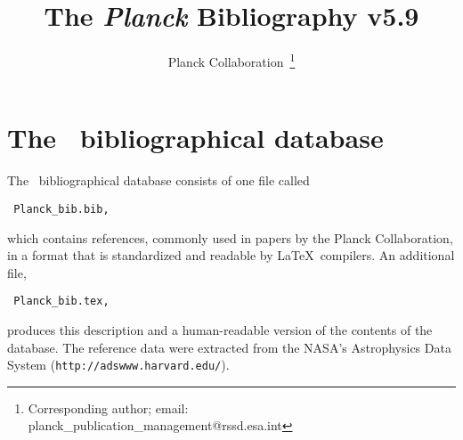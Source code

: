 \documentclass[longauth,traditabstract,referee]{aa}
\begin{document}
\title{The \textit{Planck} Bibliography v5.9}

%
\author{%
        Planck Collaboration~\thanks{Corresponding author; email: planck\_publication\_management@rssd.esa.int}
       }
%
\def\planckinstitute#1{\gdef\@institute{#1}}
\def\institutename{\par
 \begingroup
 \parindent=0pt
 \parskip=0pt
 \setcounter{inst}{1}%
 \def\and{\par\stepcounter{inst}%
 \hangindent=25pt
 \noindent
 \hbox to\instindent{\hss\tiny${\theinst}$\enspace}\ignorespaces}%
 \setbox0=\vbox{\def\thanks##1{}\@institute}
 \ifnum\value{inst}>99\relax\setbox0=\hbox{${888}$\enspace}%
   \else\ifnum\value{inst}>9\relax\setbox0=\hbox{${88}$\enspace}%
   \else\setbox0=\hbox{${8}$\enspace}\fi\fi
 \instindent\wd0\relax
 \ifnum\value{inst}=1\relax
 \else
   \setcounter{inst}{1}%
   \hangindent=25pt
   \noindent
   \hbox to\instindent{\hss\tiny${\theinst}$\enspace}\ignorespaces
 \fi
 \tiny
 \ignorespaces
 \@institute\par
 \endgroup}
%
\planckinstitute{}
\providecommand{\sorthelp}[1]{}





\maketitle

\section{The \Planck\ bibliographical database}

The \Planck\ bibliographical database consists of one file called
\begin{verbatim} Planck_bib.bib, \end{verbatim} which contains references,
commonly used in papers by
the Planck Collaboration, in a format that is standardized and
readable by La\TeX\ compilers. An additional file,
\begin{verbatim} Planck_bib.tex,
\end{verbatim} produces this description and a
human-readable version of the contents of the database.  The reference data
were extracted from the NASA's Astrophysics Data System
(\verb=http://adswww.harvard.edu/=).
\end{document}
